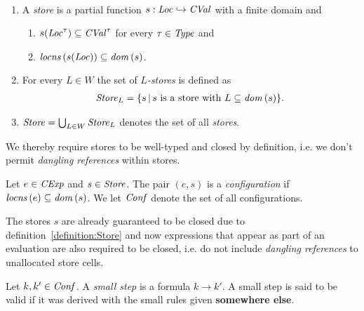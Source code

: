 \documentclass[12pt,a4paper]{report}
\newcommand{\CExp}{\nstyle{CExp}}
\newcommand{\CVal}{\nstyle{CVal}}
\newcommand{\Conf}{\nstyle{Conf}}
\begin{document}
\begin{definition}[Store] \label{definition:Store} \
  \begin{enumerate}
    \item A {\em store} is a partial function $s:\Loc \pto \CVal$ with a finite domain and
          \begin{enumerate}
            \item $s(\Loc^\tau) \subseteq \CVal^\tau$ for every $\tau\in\mathit{Type}$ and
            \item $\mathit{locns}\,(s(\mathit{Loc})) \subseteq \mathit{dom}\,(s)$.
          \end{enumerate}

    \item For every $L \in W$ the set of {\em $L$-stores} is defined as
          \[\begin{array}{l}
            \mathit{Store}_L = \{s\,|\,\text{$s$ is a store with $L\subseteq\mathit{dom}\,(s)$}\}.
          \end{array}\]

    \item $\mathit{Store} = \bigcup_{L \in W} \mathit{Store}_L$ denotes the set of all {\em stores}.
  \end{enumerate}
\end{definition}

We thereby require stores to be well-typed and closed by definition, i.e. we don't permit {\em dangling
references} within stores.

\begin{definition}[Configuration]
  Let $e\in\CExp$ and $s\in\mathit{Store}$. The pair $(e,s)$ is a {\em configuration}
  if $\mathit{locns}\,(e) \subseteq \mathit{dom}\,(s)$. We let $\Conf$ denote the set of all configurations.
\end{definition}

The stores $s$ are already guaranteed to be closed due to definition~\ref{definition:Store} and
now expressions that appear as part of an evaluation are also required to be closed, i.e. do not
include {\em dangling references} to unallocated store cells.


\begin{definition}
  Let $k,k'\in\Conf$. A {\em small step} is a formula
  $k \to k'$. A small step is said to be valid if it was derived with
  the small rules given {\bf somewhere else}.
\end{definition}
\end{document}
